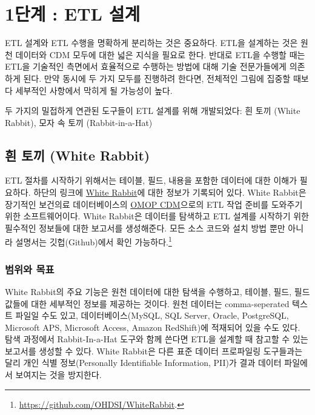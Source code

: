 \documentclass[11pt]{book}
\let\rmarkdownfootnote\footnote%
\def\footnote{\protect\rmarkdownfootnote}
\theoremstyle{definition}
\theoremstyle{definition}
\theoremstyle{definition}
\theoremstyle{remark}
\begin{document}
\section{1단계 : ETL 설계}\label{-etl-}

ETL 설계와 ETL 수행을 명확하게 분리하는 것은 중요하다. ETL을 설계하는
것은 원천 데이터와 CDM 모두에 대한 넓은 지식을 필요로 한다. 반대로 ETL을
수행할 때는 ETL을 기술적인 측면에서 효율적으로 수행하는 방법에 대해 기술
전문가들에게 의존하게 된다. 만약 동시에 두 가지 모두를 진행하려 한다면,
전체적인 그림에 집중할 때보다 세부적인 사항에서 막히게 될 가능성이 높다.

두 가지의 밀접하게 연관된 도구들이 ETL 설계를 위해 개발되었다: 흰 토끼
(White Rabbit), 모자 속 토끼 (Rabbit-in-a-Hat)

\subsection{흰 토끼 (White Rabbit)}\label{--white-rabbit}

ETL 절차를 시작하기 위해서는 테이블, 필드, 내용을 포함한 데이터에 대한
이해가 필요하다. 하단의 링크에
\href{https://github.com/OHDSI/WhiteRabbit}{White Rabbit}에 대한 정보가
기록되어 있다. White Rabbit은 장기적인 보건의료 데이터베이스의
\href{https://github.com/OHDSI/CommonDataModel}{OMOP CDM}으로의 ETL 작업
준비를 도와주기 위한 소프트웨어이다. White Rabbit은 데이터를 탐색하고
ETL 설계를 시작하기 위한 필수적인 정보들에 대한 보고서를 생성해준다.
모든 소스 코드와 설치 방법 뿐만 아니라 설명서는 깃헙(Github)에서 확인
가능하다.\footnote{\url{https://github.com/OHDSI/WhiteRabbit}.}
 

\subsubsection*{범위와 목표}\label{-}

White Rabbit의 주요 기능은 원천 데이터에 대한 탐색을 수행하고, 테이블,
필드, 필드값들에 대한 세부적인 정보를 제공하는 것이다. 원천 데이터는
comma-seperated 텍스트 파일일 수도 있고, 데이터베이스(MySQL, SQL Server,
Oracle, PostgreSQL, Microsoft APS, Microsoft Access, Amazon RedShift)에
적재되어 있을 수도 있다. 탐색 과정에서 Rabbit-In-a-Hat 도구와 함께
쓴다면 ETL을 설계할 때 참고할 수 있는 보고서를 생성할 수 있다. White
Rabbit은 다른 표준 데이터 프로파일링 도구들과는 달리 개인 식별
정보(Personally Identifiable Information, PII)가 결과 데이터 파일에서
보여지는 것을 방지한다.
\end{document}
